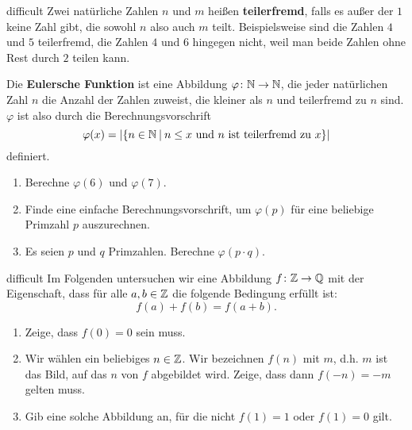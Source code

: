 \documentclass[../funktionen.tex]{subfiles}
\begin{document}
\begin{exercise}{difficult}
    Zwei natürliche Zahlen $n$ und $m$ heißen \textbf{teilerfremd}, falls es außer der $1$ keine Zahl gibt, die sowohl $n$ also auch $m$ teilt. Beispielsweise sind die Zahlen $4$ und $5$ teilerfremd, die Zahlen $4$ und $6$ hingegen nicht, weil man beide Zahlen ohne Rest durch $2$ teilen kann.
    
    Die \textbf{Eulersche Funktion} ist eine Abbildung $\varphi\colon\mathbb{N}\rightarrow\mathbb{N}$, die jeder natürlichen Zahl $n$ die Anzahl der Zahlen zuweist, die kleiner als $n$ und teilerfremd zu $n$ sind. $\varphi$ ist also durch die Berechnungsvorschrift \[\varphi(x)=\lvert\{n\in\mathbb{N}\:|\:n\leq x\text{~und~}n\text{~ist teilerfremd zu~}x\}\rvert\] definiert.
    \begin{enumerate}
        \item Berechne $\varphi(6)$ und $\varphi(7)$.
        \item Finde eine einfache Berechnungsvorschrift, um $\varphi(p)$ für eine beliebige Primzahl $p$ auszurechnen.
        \item Es seien $p$ und $q$ Primzahlen. Berechne $\varphi(p\cdot q)$.
    \end{enumerate}
\end{exercise}
\begin{exercise}{difficult}
    Im Folgenden untersuchen wir eine Abbildung $f\colon\mathbb{Z}\rightarrow\mathbb{Q}$ mit der Eigenschaft, dass für alle $a,b\in\mathbb{Z}$ die folgende Bedingung erfüllt ist:\[f(a)+f(b)=f(a+b).\]
    \begin{enumerate}
        \item Zeige, dass $f(0)=0$ sein muss.
        \item Wir wählen ein beliebiges $n\in\mathbb{Z}$. Wir bezeichnen $f(n)$ mit $m$, d.h. $m$ ist das Bild, auf das $n$ von $f$ abgebildet wird. Zeige, dass dann $f(-n)=-m$ gelten muss.
        \item Gib eine solche Abbildung an, für die nicht $f(1)=1$ oder $f(1)=0$ gilt.
        
    \end{enumerate}
\end{exercise}
\end{document}
